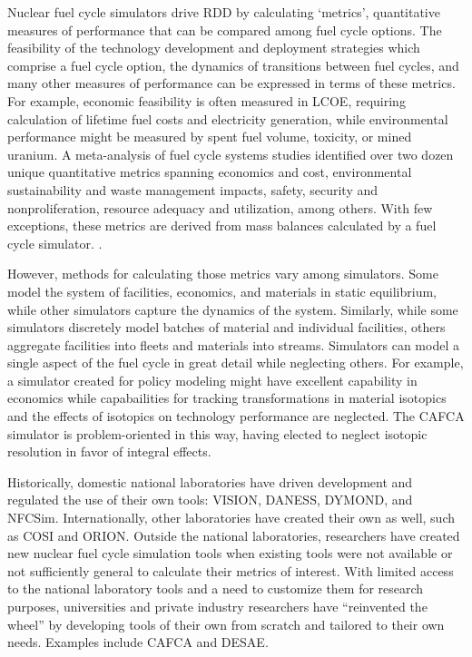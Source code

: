 Nuclear fuel cycle simulators drive \gls{RDD} by calculating `metrics',
quantitative measures of performance that can be compared among fuel cycle
options. The feasibility of the technology development and deployment
strategies which comprise a fuel cycle option, the dynamics of transitions
between fuel cycles, and many other measures of performance can be expressed in
terms of these metrics. For example, economic feasibility is often measured in
\gls{LCOE}, requiring calculation of lifetime
fuel costs and electricity generation, while environmental performance might be
measured by spent fuel volume, toxicity, or mined uranium.  A meta-analysis of
fuel cycle systems studies identified over two dozen unique quantitative
metrics spanning economics and cost, environmental sustainability and waste
management impacts, safety, security and nonproliferation, resource adequacy
and utilization, among others. With few exceptions, these metrics are derived
from mass balances calculated by a fuel cycle simulator.
\cite{flicker_evaluation_2014}.

However, methods for calculating those metrics vary among simulators. Some
model the system of facilities, economics, and materials in static equilibrium,
while other simulators capture the dynamics of the system.  Similarly, while
some simulators discretely model batches of material and individual facilities,
others aggregate facilities into fleets and materials into streams. Simulators
can model a single aspect of the fuel cycle in great detail while neglecting
others. For example, a simulator created for policy modeling might have
excellent capability in economics while capabailities for tracking transformations in
material isotopics and the effects of isotopics on technology performance are
neglected.  The \gls{CAFCA}\cite{guerin_impact_2009} simulator is problem-oriented
in this way, having elected to neglect isotopic resolution in favor of
integral effects.

Historically, domestic national laboratories have driven development and regulated
the use of their own tools: \gls{VISION}\cite{jacobson_verifiable_2010},
\gls{DANESS}\cite{van_den_durpel_daness_2009},
\gls{DYMOND}\cite{yacout_modeling_2005}, and
\gls{NFCSim}\cite{schneider_nfcsim:_2005,allan_guidance_2008}.
Internationally, other laboratories have created their own as well, such as
\gls{COSI}\cite{boucher_cosi_2005,boucher_cosi:_2006,meyer_new_2009,coquelet-pascal_comparison_2011}
and
\gls{ORION}\cite{worrall_scenario_2007}.
Outside the national laboratories,
researchers have created new nuclear fuel cycle simulation tools when existing
tools were not available or not sufficiently general to calculate their metrics
of interest.  With limited access to the national
laboratory tools and a need to customize them for research purposes,
universities and private industry researchers have ``reinvented the wheel'' by
developing tools of their own from scratch and tailored to their own needs.
Examples include \gls{CAFCA}\cite{guerin_benchmark_2009} and
\gls{DESAE}\cite{andrianova_desae_2008,mccarthy_benchmark_2012,allan_guidance_2008}.

